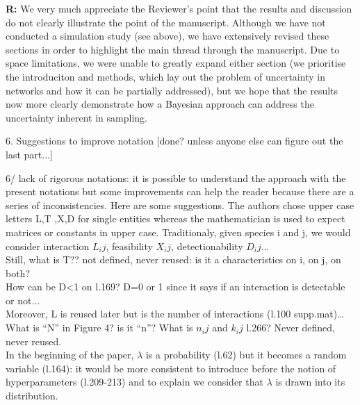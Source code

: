 \documentclass[12pt]{letter}
\newenvironment{refquote}{\bigskip \begin{it}}{\end{it}\smallskip}
\begin{document}
		\textbf{R:} We very much appreciate the Reviewer's point that the results and discussion do not clearly illustrate the point of the manuscript. Although we have not conducted a simulation study (see above), we have extensively revised these sections in order to highlight the main thread through the manuscript. Due to space limitations, we were unable to greatly expand either section (we prioritise the introduciton and methods, which lay out the problem of uncertainty in networks and how it can be partially addressed), but we hope that the results now more clearly demonstrate how a Bayesian approach can address the uncertainty inherent in sampling.


	6. Suggestions to improve notation [done? unless anyone else can figure out the last part...]


	\begin{refquote}
		6/ lack of rigorous notations: it is possible to understand the approach with the present notations but some improvements can help the reader because there are a series of inconsistencies. Here are some suggestions. The authors chose upper case letters L,T ,X,D for single entities whereas the mathematician is used to expect matrices or constants in upper case. Traditionaly, given species i and j, we would consider interaction $L_ij$, feasibility $X_ij$, detectionability $D_ij$... \\
		Still, what is T?? not defined, never reused: is it a characteristics on i, on j, on both? \\
		How can be D<1 on l.169? D=0 or 1 since it says if an interaction is detectable or not... \\
		Moreover, L is reused later but is the number of interactions (l.100 supp.mat)… \\
		What is “N” in Figure 4? is it “n”? What is $n_ij$ and $k_ij$ l.266? Never defined, never reused. \\
		In the beginning of the paper, $\lambda$ is a probability (l.62) but it becomes a random variable (l.164): it would be more consistent to introduce before the notion of hyperparameters  (l.209-213) and to explain we consider that $\lambda$ is drawn into its distribution.
	\end{refquote}
\end{document}
